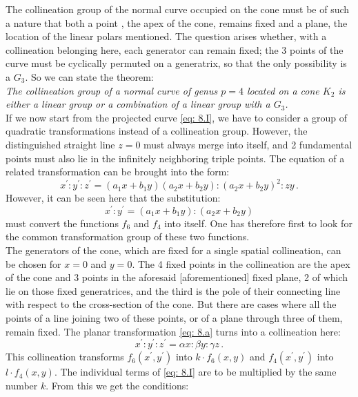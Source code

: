 \documentclass[leqno]{article}
\begin{document}
The collineation group of the normal curve occupied on the cone must be of such a nature that both a point , the apex of the cone, remains fixed and a plane, the location of the linear polars mentioned. The question arises whether, with a collineation belonging here, each generator can remain fixed; the 3 points of the curve must be cyclically permuted on a generatrix, so that the only possibility is a $G_3$. So we can state the theorem: \\
\textit{The collineation group of a normal curve of genus $p=4$ located on a cone $K_2$ is either a linear group or a combination of a linear group with a $G_3$.} \\
If we now start from the projected curve \eqref{eq: 8.I}, we have to consider a group of quadratic transformations instead of a collineation group. However, the distinguished straight line $z=0$ must always merge into itself, and 2 fundamental points must also lie in the infinitely neighboring triple points. The equation of a related transformation can be brought into the form:
\begin{equation}\label{eq: 8.a}
x^\prime : y^\prime : z^\prime = (a_1 x + b_1 y) (a_2 x + b_2 y) : (a_2 x + b_2 y)^2 : zy \, . \tag{a}
\end{equation}
However, it can be seen here that the substitution: 
\[
x^\prime : y^\prime = (a_1 x + b_1 y) : (a_2 x + b_2 y)
\] 
must convert the functions $f_6$ and $f_4$ into itself. One has therefore first to look for the common transformation group of these two functions. \\
The generators of the cone, which are fixed for a single spatial collineation, can be chosen for $x=0$ and $y=0$. The 4 fixed points in the collineation are the apex of the cone and 3 points in the aforesaid [aforementioned] fixed plane, 2 of which lie on those fixed generatrices, and the third is the pole of their connecting line with respect to the cross-section of the cone. But there are cases where all the points of a line joining two of these points, or of a plane through three of them, remain fixed. The planar transformation \eqref{eq: 8.a} turns into a collineation here:
\begin{equation}\label{eq: 8.aprime}
x^\prime : y^\prime : z^\prime = \alpha x : \beta y : \gamma z \, . \tag{$a^\prime$}
\end{equation}
This collineation transforms $f_6(x^\prime, y^\prime)$ into $k \cdot f_6(x, y)$ and $f_4(x^\prime, y^\prime)$ into $l \cdot f_4(x,y)$. The individual terms of \eqref{eq: 8.I} are to be multiplied by the same number $k$. From this we get the conditions:
\end{document}
